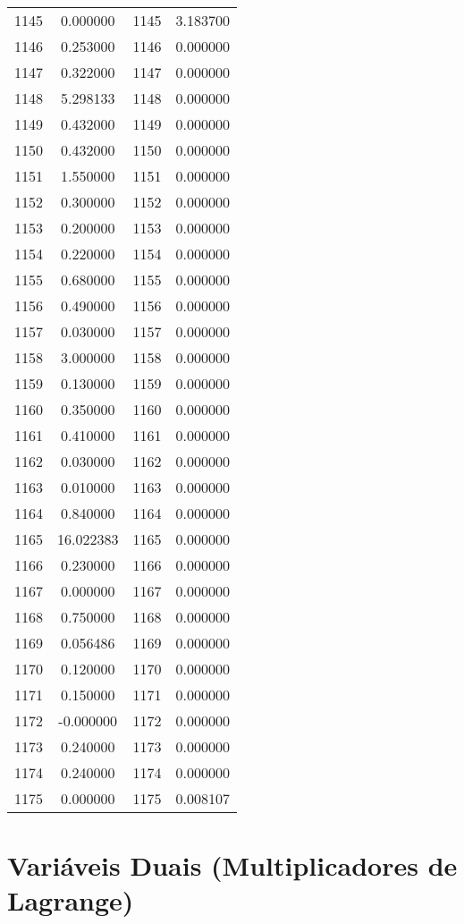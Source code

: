 \documentclass[12pt]{article}
\begin{document}
\begin{longtable}{@{}cccc@{}}
1145 & 0.000000 & 1145 & 3.183700 \\
1146 & 0.253000 & 1146 & 0.000000 \\
1147 & 0.322000 & 1147 & 0.000000 \\
1148 & 5.298133 & 1148 & 0.000000 \\
1149 & 0.432000 & 1149 & 0.000000 \\
1150 & 0.432000 & 1150 & 0.000000 \\
1151 & 1.550000 & 1151 & 0.000000 \\
1152 & 0.300000 & 1152 & 0.000000 \\
1153 & 0.200000 & 1153 & 0.000000 \\
1154 & 0.220000 & 1154 & 0.000000 \\
1155 & 0.680000 & 1155 & 0.000000 \\
1156 & 0.490000 & 1156 & 0.000000 \\
1157 & 0.030000 & 1157 & 0.000000 \\
1158 & 3.000000 & 1158 & 0.000000 \\
1159 & 0.130000 & 1159 & 0.000000 \\
1160 & 0.350000 & 1160 & 0.000000 \\
1161 & 0.410000 & 1161 & 0.000000 \\
1162 & 0.030000 & 1162 & 0.000000 \\
1163 & 0.010000 & 1163 & 0.000000 \\
1164 & 0.840000 & 1164 & 0.000000 \\
1165 & 16.022383 & 1165 & 0.000000 \\
1166 & 0.230000 & 1166 & 0.000000 \\
1167 & 0.000000 & 1167 & 0.000000 \\
1168 & 0.750000 & 1168 & 0.000000 \\
1169 & 0.056486 & 1169 & 0.000000 \\
1170 & 0.120000 & 1170 & 0.000000 \\
1171 & 0.150000 & 1171 & 0.000000 \\
1172 & -0.000000 & 1172 & 0.000000 \\
1173 & 0.240000 & 1173 & 0.000000 \\
1174 & 0.240000 & 1174 & 0.000000 \\
1175 & 0.000000 & 1175 & 0.008107 \\

\end{longtable}

\section{Variáveis Duais (Multiplicadores de Lagrange)}
\end{document}
